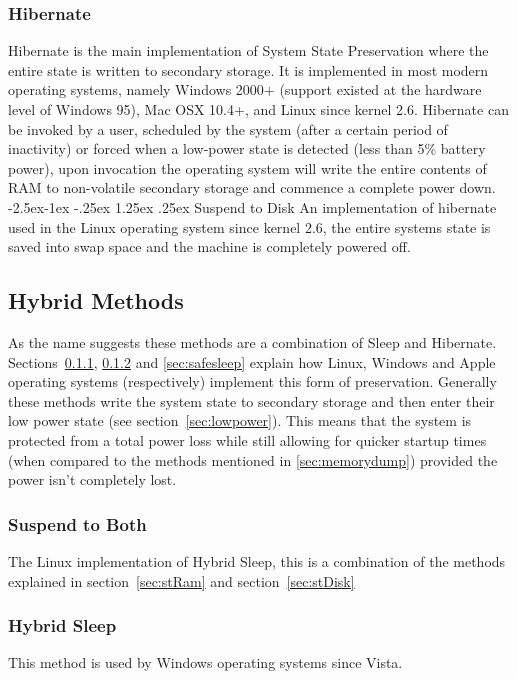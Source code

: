 \documentclass[a4paper,12pt]{article}
\makeatletter
\renewcommand\paragraph{\@startsection{paragraph}{4}{\z@}%
{-2.5ex\@plus -1ex \@minus -.25ex}%
{1.25ex \@plus .25ex}%
{\normalfont\normalsize\bfseries}}
\makeatother
\begin{document}
\subsubsection{Hibernate}\label{sec:hibernate}
Hibernate is the main implementation of System State Preservation where the entire state is written to secondary storage. It is implemented in most modern operating systems, namely Windows 2000+ (support existed at the hardware level of Windows 95), Mac OSX 10.4+, and Linux since kernel 2.6.
Hibernate can be invoked by a user, scheduled by the system (after a certain period of inactivity) or forced when a low-power state is detected (less than 5\% battery power), upon invocation the operating system will write the entire contents of RAM to non-volatile secondary storage and commence a complete power down.
\paragraph{Suspend to Disk}\label{sec:stDisk}
An implementation of hibernate used in the Linux operating system since kernel 2.6, the entire systems state is saved into swap space and the machine is completely powered off.\citep{Wiki}
\subsection{Hybrid Methods}
As the name suggests these methods are a combination of Sleep and Hibernate. Sections~\ref{sec:stBoth}, \ref{sec:hybridsleep} and \ref{sec:safesleep} explain how Linux, Windows and Apple operating systems (respectively) implement this form of preservation.
Generally these methods write the system state to secondary storage and then enter their low power state (see section~\ref{sec:lowpower}). This means that the system is protected from a total power loss while still allowing for quicker startup times (when compared to the methods mentioned in \ref{sec:memorydump}) provided the power isn't completely lost. 
\subsubsection{Suspend to Both}\label{sec:stBoth}
The Linux implementation of Hybrid Sleep, this is a combination of the methods explained in section~\ref{sec:stRam} and section~\ref{sec:stDisk}
\subsubsection{Hybrid Sleep}\label{sec:hybridsleep}
This method is used by Windows operating systems since Vista.
\end{document}
